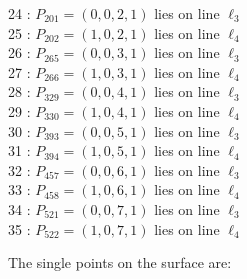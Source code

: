 \documentclass{article}
\begin{document}
{\begin{multicols}{2}
24 : $P_{201}=( 0, 0, 2, 1 )$ lies on line $\ell_{3}$\\
25 : $P_{202}=( 1, 0, 2, 1 )$ lies on line $\ell_{4}$\\
26 : $P_{265}=( 0, 0, 3, 1 )$ lies on line $\ell_{3}$\\
27 : $P_{266}=( 1, 0, 3, 1 )$ lies on line $\ell_{4}$\\
28 : $P_{329}=( 0, 0, 4, 1 )$ lies on line $\ell_{3}$\\
29 : $P_{330}=( 1, 0, 4, 1 )$ lies on line $\ell_{4}$\\
30 : $P_{393}=( 0, 0, 5, 1 )$ lies on line $\ell_{3}$\\
31 : $P_{394}=( 1, 0, 5, 1 )$ lies on line $\ell_{4}$\\
32 : $P_{457}=( 0, 0, 6, 1 )$ lies on line $\ell_{3}$\\
33 : $P_{458}=( 1, 0, 6, 1 )$ lies on line $\ell_{4}$\\
34 : $P_{521}=( 0, 0, 7, 1 )$ lies on line $\ell_{3}$\\
35 : $P_{522}=( 1, 0, 7, 1 )$ lies on line $\ell_{4}$\\
\end{multicols}
The single points on the surface are:\\
}
\end{document}
